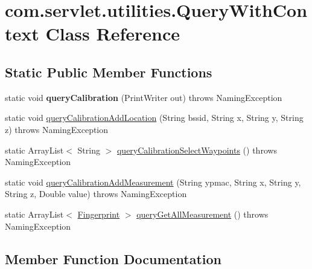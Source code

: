 \hypertarget{classcom_1_1servlet_1_1utilities_1_1_query_with_context}{}\section{com.\+servlet.\+utilities.\+Query\+With\+Context Class Reference}
\label{classcom_1_1servlet_1_1utilities_1_1_query_with_context}
\subsection*{Static Public Member Functions}
\begin{DoxyCompactItemize}
\item 
static void {\bfseries query\+Calibration} (Print\+Writer out)  throws Naming\+Exception \hypertarget{classcom_1_1servlet_1_1utilities_1_1_query_with_context_ae9b1219f8bf7e148ccbbe81d11eece82}{}\label{classcom_1_1servlet_1_1utilities_1_1_query_with_context_ae9b1219f8bf7e148ccbbe81d11eece82}

\item 
static void \hyperlink{classcom_1_1servlet_1_1utilities_1_1_query_with_context_a4addb0131978ad1a87649fbd1deb95e8}{query\+Calibration\+Add\+Location} (String bssid, String x, String y, String z)  throws Naming\+Exception 
\item 
static Array\+List$<$ String $>$ \hyperlink{classcom_1_1servlet_1_1utilities_1_1_query_with_context_a20420a1c44bf30bcd9115964a749f481}{query\+Calibration\+Select\+Waypoints} ()  throws Naming\+Exception 
\item 
static void \hyperlink{classcom_1_1servlet_1_1utilities_1_1_query_with_context_ab7f8d28e27cb314ccfe9e9abe270676a}{query\+Calibration\+Add\+Measurement} (String ypmac, String x, String y, String z, Double value)  throws Naming\+Exception 
\item 
static Array\+List$<$ \hyperlink{classcom_1_1servlet_1_1utilities_1_1_fingerprint}{Fingerprint} $>$ \hyperlink{classcom_1_1servlet_1_1utilities_1_1_query_with_context_a3b7623f0b35b4cfa23a210b4ef73f89a}{query\+Get\+All\+Measurement} ()  throws Naming\+Exception 
\end{DoxyCompactItemize}


\subsection{Member Function Documentation}
